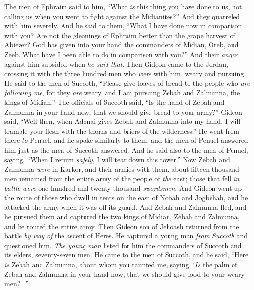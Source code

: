 \begin{biblechapter} %
 The men of Ephraim said to him, “What \textit{is} this thing you have done to us, not calling us when you went to fight against the Midianites?” And they quarreled with him severely.
\verse And he said to them, “What I have done now in comparison with you? Are not the gleanings of Ephraim better than the grape harvest of Abiezer?
\verse God has given into your hand the commanders of Midian, Oreb, and Zeeb. What have I been able to do in comparison with you?” And their \textit{anger} against him subsided when \textit{he said that}.
\verse Then Gideon came to the Jordan, crossing it with the three hundred men who \textit{were} with him, weary and pursuing.
\verse He said to the men of Succoth, “Please give loaves of bread to the people who \textit{are} \textit{following me}, for they \textit{are} weary, and I am pursuing Zebah and Zalmunna, the kings of Midian.”
\verse The officials of Succoth said, “Is the hand of Zebah and Zalmunna in your hand now, that we should give bread to your army?”
\verse Gideon said, “Well then, when Adonai gives Zebah and Zalmunna into my hand, I will trample your flesh with the thorns and briers of the wilderness.”
\verse He went from there \textit{to} Penuel, and he spoke similarly to them; and the men of Penuel answered him just as the men of Succoth answered.
\verse And he said also to the men of Penuel, saying, “When I return \textit{safely}, I will tear down this tower.”
\verse Now Zebah and Zalmunna \textit{were} in Karkor, and their armies with them, about fifteen thousand men remained from the entire army of the people of \textit{the} east; those that fell \textit{in battle were} one hundred and twenty thousand \textit{swordsmen}.
\verse And Gideon went up the route of those who dwell in tents on the east of Nobah and Jogbehah, and he attacked the army when it was off its guard.
\verse And Zebah and Zalmunna fled, and he pursued them and captured the two kings of Midian, Zebah and Zalmunna, and he routed the entire army.
\verse Then Gideon son of Jehoash returned from the battle \textit{by way of} the ascent of Heres.
\verse He captured a young man \textit{from Succoth} and questioned him. \textit{The young man} listed for him the commanders of Succoth and its elders, seventy-seven men.
\verse He came to the men of Succoth, and he said, “Here \textit{is} Zebah and Zalmunna, about whom you taunted me, saying, ‘\textit{Is} the palm of Zebah and Zalmunna in your hand now, that we should give food to your weary men?’ ”

\end{biblechapter}
